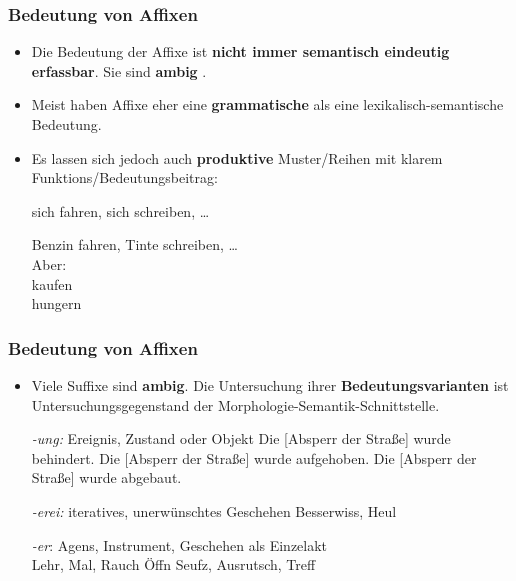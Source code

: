 \begin{frame}
\frametitle{Bedeutung von Affixen}

\begin{itemize}
\item Die Bedeutung der Affixe ist \textbf{nicht immer semantisch eindeutig erfassbar}. Sie sind \textbf{ambig} .

\item Meist haben Affixe eher eine \textbf{grammatische} als eine lexikalisch-semantische Bedeutung. 

\item Es lassen sich jedoch auch \textbf{produktive} Muster/Reihen mit klarem Funktions/Bedeutungsbeitrag:

\ea 
\ea sich fahren, sich schreiben, %
\dots\ \ras {}

\ex Benzin fahren, Tinte schreiben, %
\dots\ \ras {}\\

\ex Aber:\\
kaufen \ras {}\\
hungern \ras {}
\z
\z 
\end{itemize}

\end{frame}


\begin{frame}
\frametitle{Bedeutung von Affixen}

\begin{itemize}
\item Viele Suffixe sind \textbf{ambig}. Die Untersuchung ihrer \textbf{Bedeutungsvarianten} ist Untersuchungsgegenstand der Morphologie-Semantik-Schnittstelle.

\ea \emph{-ung:} Ereignis, Zustand oder Objekt 
\ea Die [Absperr der Straße] wurde behindert.
\ex Die [Absperr der Straße] wurde aufgehoben.
\ex Die [Absperr der Straße] wurde abgebaut.
\z 

\ex \emph{-erei:} iteratives, unerwünschtes Geschehen
\ea Besserwiss, Heul
\z

\ex \emph{-er}: Agens, Instrument, Geschehen als Einzelakt\\
\hfill {}
\ea Lehr, Mal, Rauch
\ex Öffn	
\ex Seufz, Ausrutsch, Treff %
\z 
\z 
\end{itemize}

\end{frame}



